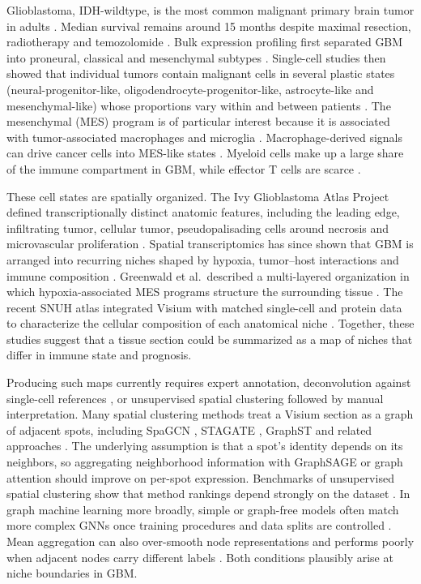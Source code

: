 \documentclass[11pt,letterpaper]{article}
\begin{document}
Glioblastoma, IDH-wildtype, is the most common malignant primary brain tumor in adults \cite{ostrom2023,louis2021}. Median survival remains around 15 months despite maximal resection, radiotherapy and temozolomide \cite{stupp2005}. Bulk expression profiling first separated GBM into proneural, classical and mesenchymal subtypes \cite{verhaak2010,tcga2008}. Single-cell studies then showed that individual tumors contain malignant cells in several plastic states (neural-progenitor-like, oligodendrocyte-progenitor-like, astrocyte-like and mesenchymal-like) whose proportions vary within and between patients \cite{neftel2019}. The mesenchymal (MES) program is of particular interest because it is associated with tumor-associated macrophages and microglia \cite{wang2017}. Macrophage-derived signals can drive cancer cells into MES-like states \cite{hara2021}. Myeloid cells make up a large share of the immune compartment in GBM, while effector T cells are scarce \cite{klemm2020,pomboantunes2021,khan2023,decordova2020,lin2024}.

These cell states are spatially organized. The Ivy Glioblastoma Atlas Project defined transcriptionally distinct anatomic features, including the leading edge, infiltrating tumor, cellular tumor, pseudopalisading cells around necrosis and microvascular proliferation \cite{puchalski2018}. Spatial transcriptomics \cite{stahl2016,moses2022} has since shown that GBM is arranged into recurring niches shaped by hypoxia, tumor--host interactions and immune composition \cite{ravi2022,greenwald2024,ruizmoreno2025}. Greenwald et al.\ described a multi-layered organization in which hypoxia-associated MES programs structure the surrounding tissue \cite{greenwald2024}. The recent SNUH atlas integrated Visium with matched single-cell and protein data to characterize the cellular composition of each anatomical niche \cite{park2026}. Together, these studies suggest that a tissue section could be summarized as a map of niches that differ in immune state and prognosis.

Producing such maps currently requires expert annotation, deconvolution against single-cell references \cite{kleshchevnikov2022,cable2022,li2022bench}, or unsupervised spatial clustering followed by manual interpretation. Many spatial clustering methods treat a Visium section as a graph of adjacent spots, including SpaGCN \cite{hu2021spagcn}, STAGATE \cite{dong2022stagate}, GraphST \cite{long2023graphst} and related approaches \cite{zhao2021bayesspace,xu2023spacel,peng2023,liu2023review,palla2022}. The underlying assumption is that a spot's identity depends on its neighbors, so aggregating neighborhood information with GraphSAGE \cite{hamilton2017} or graph attention \cite{velickovic2018} should improve on per-spot expression. Benchmarks of unsupervised spatial clustering show that method rankings depend strongly on the dataset \cite{yuan2024bench}. In graph machine learning more broadly, simple or graph-free models often match more complex GNNs once training procedures and data splits are controlled \cite{shchur2018,errica2020}. Mean aggregation can also over-smooth node representations \cite{li2018deeper} and performs poorly when adjacent nodes carry different labels \cite{zhu2020homophily}. Both conditions plausibly arise at niche boundaries in GBM.
\end{document}
